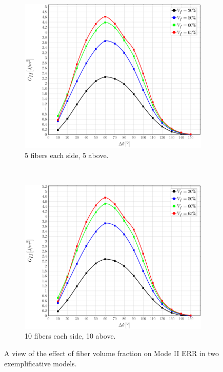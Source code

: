 \documentclass[review]{elsarticle}
\begin{document}
\begin{figure}[!h]
\centering
    \begin{subfigure}[b]{0.475\textwidth}
        \includegraphics[width=\textwidth]{vf-smallermodel-GII.pdf}
        \caption{5 fibers each side, 5 above.}\label{subfig:volfracsmallerMII}
    \end{subfigure} ~
    \begin{subfigure}[b]{0.475\textwidth}
        \includegraphics[width=\textwidth]{vf-biggermodel-GII.pdf}
        \caption{10 fibers each side, 10 above.}\label{subfig:volfracbiggerMII}
    \end{subfigure}

\caption{A view of the effect of fiber volume fraction on Mode II ERR in two exemplificative models.}\label{fig:volumefractionMII}
\end{figure}
\end{document}

